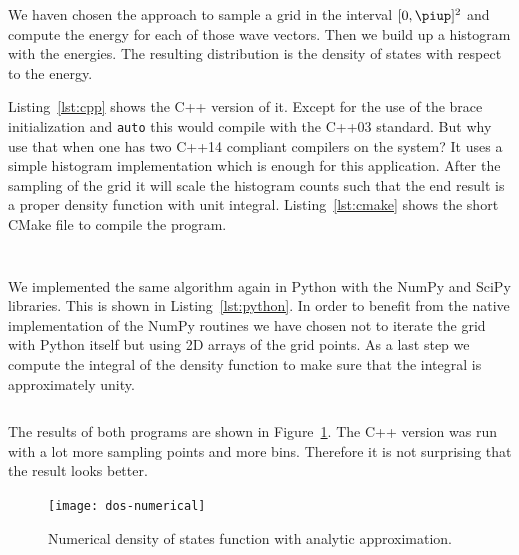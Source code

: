 \documentclass[11pt, english, fleqn, DIV=15, headinclude, BCOR=1cm]{scrartcl}
\begin{document}
We haven chosen the approach to sample a grid in the interval $[0, \piup]^2$
and compute the energy for each of those wave vectors. Then we build up a
histogram with the energies. The resulting distribution is the density of
states with respect to the energy.

Listing~\ref{lst:cpp} shows the C++ version of it. Except for the use of the
brace initialization and \texttt{auto} this would compile with the C++03
standard. But why use that when one has two C++14 compliant compilers on the
system? It uses a simple histogram implementation which is enough for this
application. After the sampling of the grid it will scale the histogram counts
such that the end result is a proper density function with unit integral.
Listing~\ref{lst:cmake} shows the short CMake file to compile the program.

\begin{listing}[tb]
    \inputminted[linenos, fontsize=\footnotesize]{cpp}{dos.cpp}
    \caption{%
        C++ program for density of state computation.
    }
    \label{lst:cpp}
\end{listing}

\begin{listing}[tb]
    \inputminted[linenos, fontsize=\footnotesize]{cmake}{CMakeLists.txt}
    \caption{%
        CMake build file for C++ program.
    }
    \label{lst:cmake}
\end{listing}

We implemented the same algorithm again in Python with the NumPy and SciPy
libraries. This is shown in Listing~\ref{lst:python}. In order to benefit from
the native implementation of the NumPy routines we have chosen not to iterate
the grid with Python itself but using 2D arrays of the grid points. As a last
step we compute the integral of the density function to make sure that the
integral is approximately unity.

\begin{listing}[tb]
    \inputminted[linenos, fontsize=\footnotesize]{python}{dos.py}
    \caption{%
        Python program for density of state computation.
    }
    \label{lst:python}
\end{listing}

The results of both programs are shown in Figure~\ref{fig:dos-numerical}. The
C++ version was run with a lot more sampling points and more bins. Therefore it
is not surprising that the result looks better.

\begin{figure}
    \centering
    \texttt{[image: dos-numerical]}
    \caption{%
        Numerical density of states function with analytic approximation.
    }
    \label{fig:dos-numerical}
\end{figure}
\end{document}
